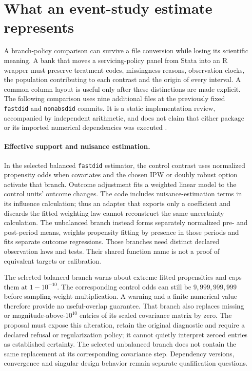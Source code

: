 \section{What an event-study estimate represents}
\label{sec:exec28-panel-estimator-contracts}

A branch-policy comparison can survive a file conversion while losing its
scientific meaning. A bank that moves a servicing-policy panel from Stata into
an R wrapper must preserve treatment codes, missingness reasons, observation
clocks, the population contributing to each contrast and the origin of every
interval. A common column layout is useful only after these distinctions are
made explicit. The following comparison uses nine additional files at the
previously fixed \texttt{fastdid} and \texttt{nonabsdid} commits. It is a static
implementation review, accompanied by independent arithmetic, and does not
claim that either package or its imported numerical dependencies was executed
\citep{exec28_panel_estimator_sources,exec28_panel_estimator_reference}.

\paragraph{Effective support and nuisance estimation.}
In the selected balanced \texttt{fastdid} estimator, the control contrast uses
normalized propensity odds when covariates and the chosen IPW or doubly robust
option activate that branch. Outcome adjustment fits a weighted linear model
to the control units' outcome changes. The code includes nuisance-estimation
terms in its influence calculation; thus an adapter that exports only a
coefficient and discards the fitted weighting law cannot reconstruct the same
uncertainty calculation. The unbalanced branch instead forms separately
normalized pre- and post-period means, weights propensity fitting by presence
in those periods and fits separate outcome regressions. Those branches need
distinct declared observation laws and tests. Their shared function name is
not a proof of equivalent targets or calibration.

The selected balanced branch warns about extreme fitted propensities and caps
them at $1-10^{-10}$. The corresponding control odds can still be
$9{,}999{,}999{,}999$ before sampling-weight multiplication. A warning and a
finite numerical value therefore provide no useful-overlap guarantee. That
branch also replaces missing or magnitude-above-$10^{10}$ entries of its
scaled covariance matrix by zero. The proposal must expose this alteration,
retain the original diagnostic and require a declared refusal or regularization
policy; it cannot quietly interpret zeroed entries as established certainty.
The selected unbalanced branch does not contain the same replacement at its
corresponding covariance step. Dependency versions, convergence and singular
design behavior remain separate qualification questions.

